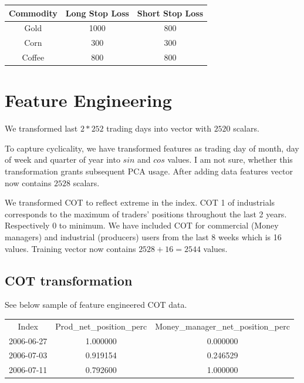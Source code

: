 \documentclass[final,2p]{elsarticle}
\begin{document}
\begin{center}
\begin{tabular}{|c|c|c|}
    \hline
    Commodity & Long Stop Loss & Short Stop Loss \\
    \hline
    Gold & 1000 & 800 \\
    Corn & 300 & 300 \\
    Coffee & 800 & 800 \\
    \hline
\end{tabular}
\end{center}

\clearpage

\section{Feature Engineering}

We transformed last $2*252$ trading days into vector with $2520$ scalars.

To capture cyclicality, we have transformed features as trading day of month, day of week and quarter of year into $sin$ and $cos$ values.
I am not sure, whether this transformation grants subsequent PCA usage.
After adding data features vector now contains $2528$ scalars.

We transformed COT to reflect extreme in the index. COT 1 of industrials corresponds to the maximum of traders' positions throughout the last 2 years.
Respectively 0 to minimum. We have included COT for commercial (Money managers) and industrial (producers) users from the last 8 weeks which is 16 values.
Training vector now contains $2528+16=2544$ values.

\subsection{COT transformation}

See below sample of feature engineered COT data.

\begin{center}
    \begin{tabular}{ccc}
 	    Index & Prod\_net\_position\_perc & Money\_manager\_net\_position\_perc\\
        2006-06-27 &1.000000 &0.000000\\
        2006-07-03 &0.919154 &0.246529\\
        2006-07-11 &0.792600 &1.000000\\
    \end{tabular}
\end{center}
\end{document}
